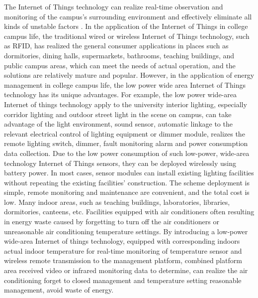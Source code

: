 \documentclass[conference]{IEEEtran}
\begin{document}
The Internet of Things technology can realize real-time observation and monitoring of the campus's surrounding environment and effectively eliminate all kinds of unstable factors \cite{INTCAMPUS:AppAndDevOfIOT}. In the application of the Internet of Things in college campus life, the traditional wired or wireless Internet of Things technology, such as RFID, has realized the general consumer applications in places such as dormitories, dining halls, supermarkets, bathrooms, teaching buildings, and public campus areas, which can meet the needs of actual operation, and the solutions are relatively mature and popular. However, in the application of energy management in college campus life, the low power wide area Internet of Things technology has its unique advantages. For example, the low power wide-area Internet of things technology apply to the university interior lighting, especially corridor lighting and outdoor street light in the scene on campus, can take advantage of the light environment, sound sensor, automatic linkage to the relevant electrical control of lighting equipment or dimmer module, realizes the remote lighting switch, dimmer, fault monitoring alarm and power consumption data collection. Due to the low power consumption of such low-power, wide-area technology Internet of Things sensors, they can be deployed wirelessly using battery power.
In most cases, sensor modules can install existing lighting facilities without repeating the existing facilities' construction. The scheme deployment is simple, remote monitoring and maintenance are convenient, and the total cost is low. Many indoor areas, such as teaching buildings, laboratories, libraries, dormitories, canteens, etc. Facilities equipped with air conditioners often resulting in energy waste caused by forgetting to turn off the air conditioners or unreasonable air conditioning temperature settings. By introducing a low-power wide-area Internet of things technology, equipped with corresponding indoors actual indoor temperature for real-time monitoring of temperature sensor and wireless remote transmission to the management platform, combined platform area received video or infrared monitoring data to determine, can realize the air conditioning forget to closed management and temperature setting reasonable management, avoid waste of energy.
\end{document}
